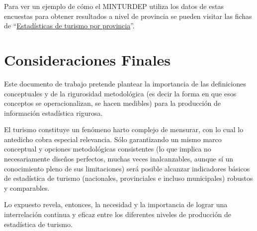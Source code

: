 \documentclass[
]{book}
\begin{document}
Para ver un ejemplo de cómo el MINTURDEP utiliza los datos de estas encuestas para obtener resultados a nivel de provincia se pueden visitar las fichas de ``\href{https://www.yvera.tur.ar/estadistica/info/estadisticas-de-turismo-por-provincias}{Estadísticas de turismo por provincia}''.

\hypertarget{consideraciones-finales}{%
\chapter*{Consideraciones Finales}\label{consideraciones-finales}}

Este documento de trabajo pretende plantear la importancia de las definiciones conceptuales y de la rigurosidad metodológica (es decir la forma en que esos conceptos se operacionalizan, se hacen medibles) para la producción de información estadística rigurosa.

El turismo constituye un fenómeno harto complejo de mensurar, con lo cual lo antedicho cobra especial relevancia.
Sólo garantizando un mismo marco conceptual y opciones metodológicas consistentes (lo que implica no necesariamente diseños perfectos, muchas veces inalcanzables, aunque sí un conocimiento pleno de sus limitaciones) será posible alcanzar indicadores básicos de estadística de turismo (nacionales, provinciales e incluso municipales) robustos y comparables.

Lo expuesto revela, entonces, la necesidad y la importancia de lograr una interrelación continua y eficaz entre los diferentes niveles de producción de estadística de turismo.

  
\end{document}
